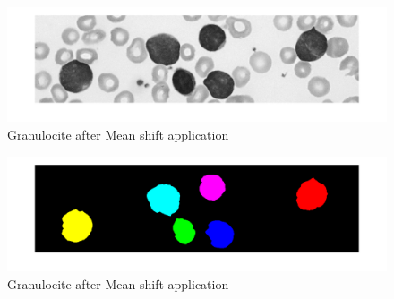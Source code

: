 \bigskip
\begin{figure}
\begin{center}
		\includegraphics[scale=0.5]{img/final/nooverlap.png}
		\caption{Granulocite after Mean shift application}
		\label{fig:noover}
\end{center}
\end{figure}
\begin{figure}
\begin{center}
		\includegraphics[scale=0.5]{img/final/nooverlapseg.png}
		\caption{Granulocite after Mean shift application}
		\label{fig:nooverseg}
\end{center}
\end{figure}


